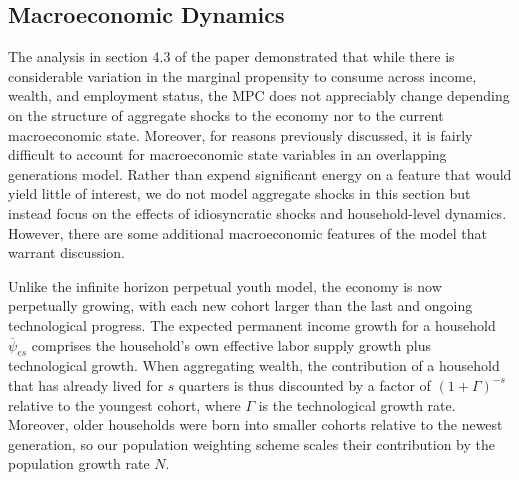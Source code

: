 \documentclass[11pt,a4paper,pdftex]{article}\usepackage[pdftex]{graphicx}\usepackage{epstopdf} \usepackage[pdftex]{hyperref}
\newcommand{\pshk}{\psi} %
\begin{document}
\subsection{Macroeconomic Dynamics}

The analysis in section 4.3 of the paper demonstrated that while there is considerable variation in the marginal propensity to consume across income, wealth, and employment status, the MPC does not appreciably change depending on the structure of aggregate shocks to the economy nor to the current macroeconomic state.  Moreover, for reasons previously discussed, it is fairly difficult to account for macroeconomic state variables in an overlapping generations model.  Rather than expend significant energy on a feature that would yield little of interest, we do not model aggregate shocks in this section but instead focus on the effects of idiosyncratic shocks and household-level dynamics.  However, there are some additional macroeconomic features of the model that warrant discussion.

Unlike the infinite horizon perpetual youth model, the economy is now perpetually growing, with each new cohort larger than the last and ongoing technological progress.  The expected permanent income growth for a household $\overline{\pshk}_{es}$ comprises the household's own effective labor supply growth plus technological growth.  When aggregating wealth, the contribution of a household that has already lived for $s$ quarters is thus discounted by a factor of $(1 + \Gamma)^{-s}$ relative to the youngest cohort, where $\Gamma$ is the technological growth rate.  Moreover, older households were born into smaller cohorts relative to the newest generation, so our population weighting scheme scales their contribution by the population growth rate $N$.
\end{document}
